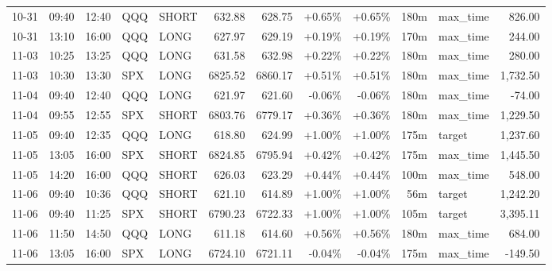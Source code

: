 \documentclass[11pt,a4paper]{article}
\begin{document}
\begin{center}
\begin{longtable}{>{\color{txtmain}}l l l l l r r r r r >{\color{txtmain}}l r}
10-31 & 09:40 & 12:40 & QQQ & SHORT & 632.88 & 628.75 & \textcolor{wingreen}{+0.65\%} & \textcolor{wingreen}{+0.65\%} & 180m & max\_time & \textcolor{wingreen}{826.00} \\
10-31 & 13:10 & 16:00 & QQQ & LONG & 627.97 & 629.19 & \textcolor{wingreen}{+0.19\%} & \textcolor{wingreen}{+0.19\%} & 170m & max\_time & \textcolor{wingreen}{244.00} \\
11-03 & 10:25 & 13:25 & QQQ & LONG & 631.58 & 632.98 & \textcolor{wingreen}{+0.22\%} & \textcolor{wingreen}{+0.22\%} & 180m & max\_time & \textcolor{wingreen}{280.00} \\
11-03 & 10:30 & 13:30 & SPX & LONG & 6825.52 & 6860.17 & \textcolor{wingreen}{+0.51\%} & \textcolor{wingreen}{+0.51\%} & 180m & max\_time & \textcolor{wingreen}{1,732.50} \\
11-04 & 09:40 & 12:40 & QQQ & LONG & 621.97 & 621.60 & \textcolor{lossred}{-0.06\%} & \textcolor{lossred}{-0.06\%} & 180m & max\_time & \textcolor{lossred}{-74.00} \\
11-04 & 09:55 & 12:55 & SPX & SHORT & 6803.76 & 6779.17 & \textcolor{wingreen}{+0.36\%} & \textcolor{wingreen}{+0.36\%} & 180m & max\_time & \textcolor{wingreen}{1,229.50} \\
11-05 & 09:40 & 12:35 & QQQ & LONG & 618.80 & 624.99 & \textcolor{wingreen}{+1.00\%} & \textcolor{wingreen}{+1.00\%} & 175m & target & \textcolor{wingreen}{1,237.60} \\
11-05 & 13:05 & 16:00 & SPX & SHORT & 6824.85 & 6795.94 & \textcolor{wingreen}{+0.42\%} & \textcolor{wingreen}{+0.42\%} & 175m & max\_time & \textcolor{wingreen}{1,445.50} \\
11-05 & 14:20 & 16:00 & QQQ & SHORT & 626.03 & 623.29 & \textcolor{wingreen}{+0.44\%} & \textcolor{wingreen}{+0.44\%} & 100m & max\_time & \textcolor{wingreen}{548.00} \\
11-06 & 09:40 & 10:36 & QQQ & SHORT & 621.10 & 614.89 & \textcolor{wingreen}{+1.00\%} & \textcolor{wingreen}{+1.00\%} & 56m & target & \textcolor{wingreen}{1,242.20} \\
11-06 & 09:40 & 11:25 & SPX & SHORT & 6790.23 & 6722.33 & \textcolor{wingreen}{+1.00\%} & \textcolor{wingreen}{+1.00\%} & 105m & target & \textcolor{wingreen}{3,395.11} \\
11-06 & 11:50 & 14:50 & QQQ & LONG & 611.18 & 614.60 & \textcolor{wingreen}{+0.56\%} & \textcolor{wingreen}{+0.56\%} & 180m & max\_time & \textcolor{wingreen}{684.00} \\
11-06 & 13:05 & 16:00 & SPX & LONG & 6724.10 & 6721.11 & \textcolor{lossred}{-0.04\%} & \textcolor{lossred}{-0.04\%} & 175m & max\_time & \textcolor{lossred}{-149.50} \\

\end{longtable}
\end{center}
\end{document}

